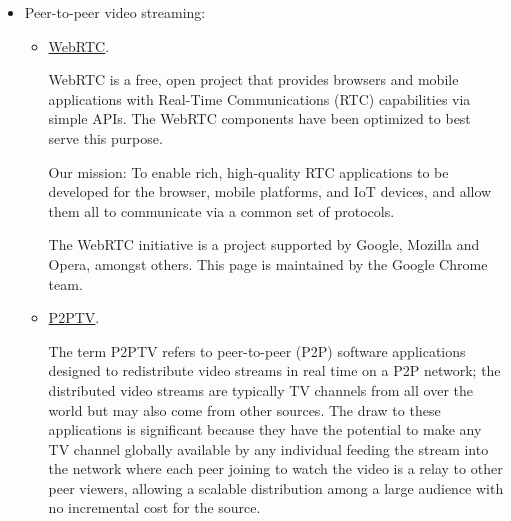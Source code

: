\begin{itemize}
    \item Peer-to-peer video streaming:
    \begin{itemize}
        \item \href{https://webrtc.org/}{WebRTC}.
        \begin{displayquote}
WebRTC is a free, open project that provides browsers and mobile applications with Real-Time Communications (RTC) capabilities via simple APIs. The WebRTC components have been optimized to best serve this purpose.

Our mission: To enable rich, high-quality RTC applications to be developed for the browser, mobile platforms, and IoT devices, and allow them all to communicate via a common set of protocols.

The WebRTC initiative is a project supported by Google, Mozilla and Opera, amongst others. This page is maintained by the Google Chrome team.
        \end{displayquote}
        \item \href{https://en.wikipedia.org/wiki/P2PTV}{P2PTV}.
        \begin{displayquote}
The term P2PTV refers to peer-to-peer (P2P) software applications designed to redistribute video streams in real time on a P2P network; the distributed video streams are typically TV channels from all over the world but may also come from other sources. The draw to these applications is significant because they have the potential to make any TV channel globally available by any individual feeding the stream into the network where each peer joining to watch the video is a relay to other peer viewers, allowing a scalable distribution among a large audience with no incremental cost for the source.
        \end{displayquote}
    \end{itemize}


\end{itemize}
